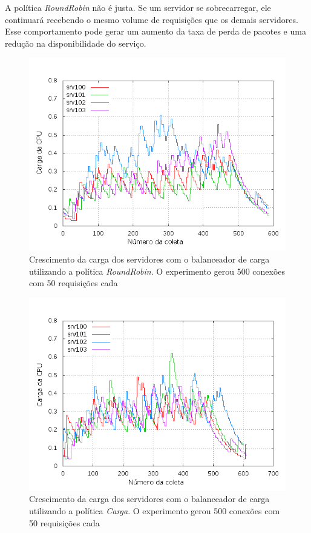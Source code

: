 A política \emph{RoundRobin} não é justa.
Se um servidor se sobrecarregar, ele continuará recebendo o mesmo volume de 
requisições que os demais servidores.
Esse comportamento pode gerar um aumento da taxa de perda de pacotes e uma 
redução na disponibilidade do serviço.

\begin{figure}[htb!]
    \centering
    \includegraphics[scale=0.5]{img/balancer-serial-rr}
\caption{Crescimento da carga dos servidores com o balanceador de carga 
    utilizando a política \emph{RoundRobin}. O experimento gerou 500 conexões 
        com 50 requisições cada}
    \label{fig:balancer-serial-rr}
\end{figure}


\begin{figure}[htb!]
    \centering
    \includegraphics[scale=0.5]{img/balancer-serial-load}
    \caption{Crescimento da carga dos servidores com o balanceador de carga
    utilizando a política \emph{Carga}. O experimento gerou 500 conexões com 
    50 requisições cada}
    \label{fig:balancer-serial-load}
\end{figure}

